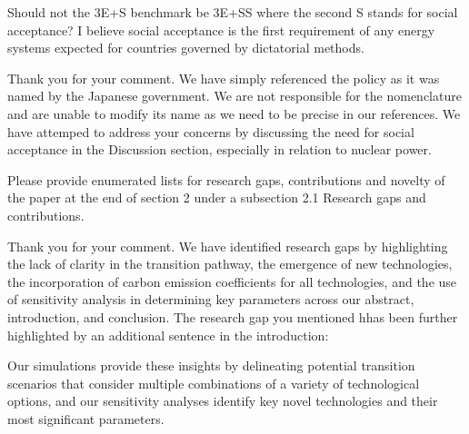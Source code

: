 \documentclass[answers,11pt]{exam}
\begin{document}
\begin{questions}
\begin{solution}
\begin{itemize}
                 \end{itemize}                 
                 
                 
        \end{solution}


  
                        \question  Should not the 3E+S benchmark be 3E+SS where the second S stands for social acceptance? I believe social acceptance is the first requirement of any energy systems expected for countries governed by dictatorial methods.
        
        \begin{solution}
        
                 Thank you for your comment. We have simply referenced the policy as it was named by the Japanese government. We are not responsible for the nomenclature and are unable to modify its name as we need to be precise in our references. We have attemped to address your concerns by discussing the need for social acceptance in the Discussion section, especially in relation to nuclear power.
                 
                 
        \end{solution}      
        
        
                        \question   Please provide enumerated lists for research gaps, contributions and novelty of the paper at the end of section 2 under a subsection 2.1 Research gaps and contributions.
                                
        \begin{solution}
        
                 Thank you for your comment. We have identified research gaps by highlighting the lack of clarity in the transition pathway, the emergence of new technologies, the incorporation of carbon emission coefficients for all technologies, and the use of sensitivity analysis in determining key parameters across our abstract, introduction, and conclusion. The research gap you mentioned hhas been further highlighted by an additional sentence in the introduction:
                 
                 Our simulations provide these insights by delineating potential transition scenarios that consider multiple combinations of a variety of technological options, and our sensitivity analyses identify key novel technologies and their most significant parameters.
                 

\end{solution}
\end{questions}
\end{document}
